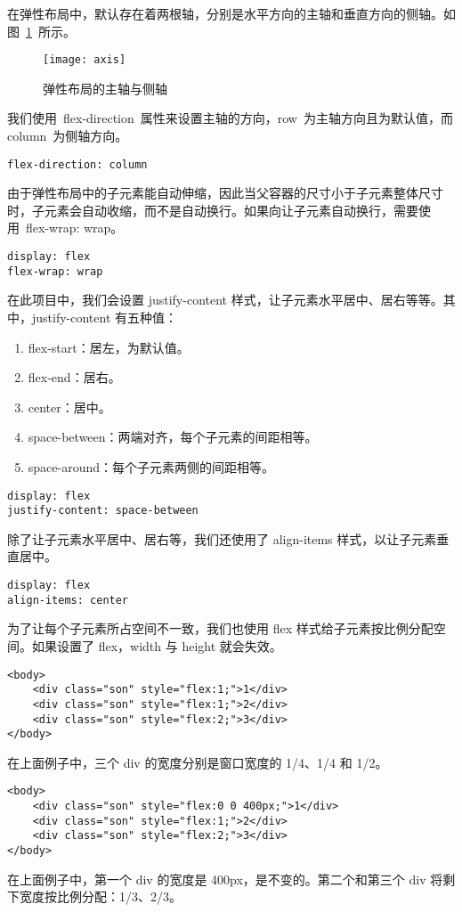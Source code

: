 在弹性布局中，默认存在着两根轴，分别是水平方向的主轴和垂直方向的侧轴。如图~\ref{fig:axis}~所示。
\begin{figure}[htbp]
    \centering
    \texttt{[image: axis]}
    \caption{弹性布局的主轴与侧轴}\label{fig:axis}
    \vspace{\baselineskip}
\end{figure}

我们使用~flex-direction~属性来设置主轴的方向，row~为主轴方向且为默认值，而column~为侧轴方向。
\begin{lstlisting}[basicstyle=\footnotesize]
flex-direction: column
\end{lstlisting}

由于弹性布局中的子元素能自动伸缩，因此当父容器的尺寸小于子元素整体尺寸时，子元素会自动收缩，而不是自动换行。如果向让子元素自动换行，需要使用~flex-wrap: wrap。
\begin{lstlisting}[basicstyle=\footnotesize]
display: flex
flex-wrap: wrap
\end{lstlisting}

在此项目中，我们会设置 justify-content 样式，让子元素水平居中、居右等等。其中，justify-content 有五种值：
\begin{enumerate}
    \item{flex-start}：居左，为默认值。
    \item {flex-end}：居右。
    \item {center}：居中。
    \item {space-between}：两端对齐，每个子元素的间距相等。
    \item {space-around}：每个子元素两侧的间距相等。
\end{enumerate}
\begin{lstlisting}[basicstyle=\footnotesize]
display: flex
justify-content: space-between
\end{lstlisting}

除了让子元素水平居中、居右等，我们还使用了 align-items 样式，以让子元素垂直居中。
\begin{lstlisting}[basicstyle=\footnotesize]
display: flex
align-items: center
\end{lstlisting}

为了让每个子元素所占空间不一致，我们也使用 flex 样式给子元素按比例分配空间。如果设置了 flex，width 与 height 就会失效。
\begin{lstlisting}[basicstyle=\footnotesize]
<body>
    <div class="son" style="flex:1;">1</div>
    <div class="son" style="flex:1;">2</div>
    <div class="son" style="flex:2;">3</div>
</body>
\end{lstlisting}
在上面例子中，三个 div 的宽度分别是窗口宽度的 1/4、1/4 和 1/2。
\begin{lstlisting}[basicstyle=\footnotesize]
<body>
    <div class="son" style="flex:0 0 400px;">1</div>
    <div class="son" style="flex:1;">2</div>
    <div class="son" style="flex:2;">3</div>
</body>
\end{lstlisting}
在上面例子中，第一个 div 的宽度是 400px，是不变的。第二个和第三个 div 将剩下宽度按比例分配：1/3、2/3。

